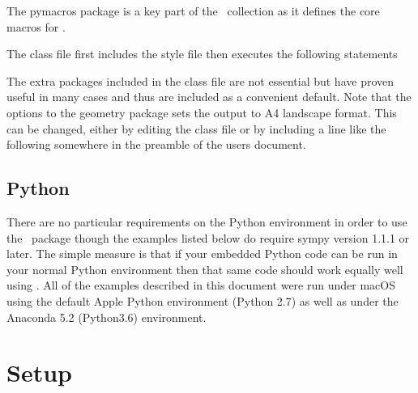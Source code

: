 \documentclass[12pt]{article}
\begin{document}
\vskip 12pt

\begin{latex}
   \usepackage{comment}
   \usepackage{listings}
   \usepackage{keyval}
   \usepackage{etoolbox}
   \usepackage{xcolor}
   \usepackage{pymacros}
\end{latex}

The {\tts pymacros} package is a key part of the \pyLaTeX\ collection as it defines
the core macros for \pyLaTeX.

The class file first includes the style file then executes the following statements

\vskip 12pt

\begin{latex}
   \usepackage[papersize={297mm,210mm},
               hmargin=2cm,tmargin=1.0cm,bmargin=1.5cm]{geometry}
   \usepackage{amsmath}
   \usepackage{amssymb}
   \usepackage{hyperref}
   \usepackage{breqn}
\end{latex}

The extra packages included in the class file are not essential but have proven
useful in many cases and thus are included as a convenient default. Note that the
options to the geometry package sets the output to A4 landscape format. This can be
changed, either by editing the class file or by including a line like the following
somewhere in the preamble of the users document.

\vskip 6pt

\begin{latex}
  \geometry{margin=2.0cm,paperheight=25cm}
\end{latex}

\subsection{Python}
There are no particular requirements on the Python environment in order to use the
\pyLaTeX\ package though the examples listed below do require {\tts sympy} version
1.1.1 or later. The simple measure is that if your embedded Python code can be run
in your normal Python environment then that same code should work equally well
using \pyLaTeX. All of the examples described in this document were run under macOS
using the default Apple Python environment (Python 2.7) as well as under the
Anaconda 5.2 (Python3.6) environment.

\section{Setup}
\end{document}
